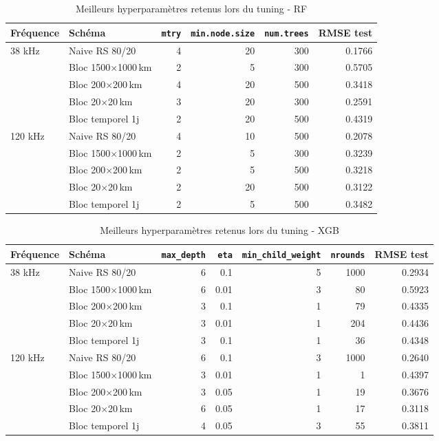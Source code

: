 \documentclass[11pt,a4paper,oneside]{report}
\begin{document}
	\begin{table}[H]
		\centering
		\small
		\begin{tabularx}{\textwidth}{l l r r r r}
			\toprule
			Fr\'equence & Sch\'ema & \texttt{mtry} & \texttt{min.node.size} & \texttt{num.trees} & RMSE test \\
			\midrule
			38 kHz & Naive RS 80/20 &     4 &    20 &   300 & 0.1766 \\
			& Bloc 1500$\times$1000\,km &     2 &     5 &   300 & 0.5705 \\
			& Bloc 200$\times$200\,km &     4 &    20 &   500 & 0.3418 \\
			& Bloc 20$\times$20\,km &     3 &    20 &   300 & 0.2591 \\
			& Bloc temporel 1j &     2 &    20 &   500 & 0.4319 \\
			\midrule
			120 kHz & Naive RS 80/20 &     4 &    10 &   500 & 0.2078 \\
			& Bloc 1500$\times$1000\,km &     2 &     5 &   300 & 0.3239 \\
			& Bloc 200$\times$200\,km &     2 &     5 &   500 & 0.3218 \\
			& Bloc 20$\times$20\,km &     2 &    20 &   500 & 0.3122 \\
			& Bloc temporel 1j &     2 &     5 &   500 & 0.3482 \\
			\bottomrule
		\end{tabularx}
		\caption{Meilleurs hyperparam\`etres retenus lors du tuning - RF}
		\label{tab:tuning_summary_rf}
	\end{table}
	
	\begin{table}[H]
		\centering
		\small
		\begin{tabularx}{\textwidth}{l l r r r r r}
			\toprule
			Fr\'equence & Sch\'ema & \texttt{max\_depth} & \texttt{eta} & \texttt{min\_child\_weight} & \texttt{nrounds} & RMSE test \\
			\midrule
			38 kHz & Naive RS 80/20 &     6 &   0.1 &     5 &  1000 & 0.2934 \\
			& Bloc 1500$\times$1000\,km &     6 &  0.01 &     3 &    80 & 0.5923 \\
			& Bloc 200$\times$200\,km &     3 &   0.1 &     1 &    79 & 0.4335 \\
			& Bloc 20$\times$20\,km &     3 &  0.01 &     1 &   204 & 0.4436 \\
			& Bloc temporel 1j &     3 &   0.1 &     1 &    36 & 0.4348 \\
			\midrule
			120 kHz & Naive RS 80/20 &     6 &   0.1 &     3 &  1000 & 0.2640 \\
			& Bloc 1500$\times$1000\,km &     3 &  0.01 &     1 &     1 & 0.4397 \\
			& Bloc 200$\times$200\,km &     3 &  0.05 &     1 &    19 & 0.3676 \\
			& Bloc 20$\times$20\,km &     6 &  0.05 &     1 &    17 & 0.3118 \\
			& Bloc temporel 1j &     4 &  0.05 &     3 &    55 & 0.3811 \\
			\bottomrule
		\end{tabularx}
		\caption{Meilleurs hyperparam\`etres retenus lors du tuning - XGB}
		\label{tab:tuning_summary_xgb}
	\end{table}
	
\end{document}
